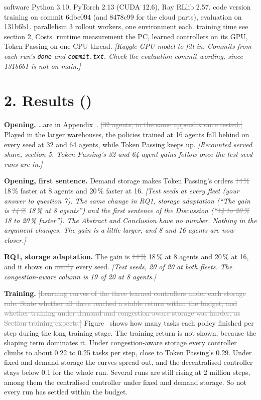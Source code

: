\documentclass[11pt,a4paper]{article}
\newcommand{\new}[1]{\textcolor{newc}{#1}}
\newcommand{\old}[1]{\textcolor{gray}{\sout{#1}}}
\newcommand{\note}[1]{{\small\itshape [#1]}}
\newcommand{\lab}[1]{\textsf{\footnotesize\detokenize{#1}}}
\renewcommand{\ref}[1]{\lab{#1}}
\begin{document}
\new{software} Python 3.10, PyTorch 2.13 (CUDA 12.6), Ray RLlib 2.57.
\new{code version} training on commit 6dbe094 (and 8478c99 for the cloud
parts), evaluation on 131b6b1. \new{parallelism} 3 rollout workers, one
environment each. \new{training time} see section 2, Costs.
\new{runtime measurement} the PC, learned controllers on its GPU, Token
Passing on one CPU thread.
\note{Kaggle GPU model to fill in. Commits from each run's \texttt{done} and
\texttt{commit.txt}. Check the evaluation commit wording, since 131b6b1 is not
on main.}

\section*{2. Results (\lab{sec:exp:results})}

\textbf{Opening.} \ldots are in Appendix~\ref{app:results:tests}.
\old{[32 agents, in the same appendix once tested.]}
\new{Played in the larger warehouses, the policies trained at 16 agents fall
behind on every seed at 32 and 64 agents, while Token Passing keeps up.}
\note{Recounted served share, section 5. Token Passing's 32 and 64-agent gains
follow once the test-seed runs are in.}

\textbf{Opening, first sentence.} Demand storage makes Token Passing's orders
\old{14\,\%} \new{18\,\%} faster at 8 agents and 20\,\% faster at 16.
\note{Test seeds at every fleet (your answer to question 7). The same change in
RQ1, storage adaptation (``The gain is \old{14\,\%} \new{18\,\%} at 8 agents'')
and the first sentence of the Discussion (``\old{14 to 20\,\%}
\new{18 to 20\,\%} faster''). The Abstract and Conclusion have no number.
Nothing in the argument changes. The gain is a little larger, and 8 and 16
agents are now closer.}

\textbf{RQ1, storage adaptation.} The gain is \old{14\,\%} \new{18\,\%} at 8
agents and 20\,\% at 16, and it shows on \old{nearly} every seed.
\note{Test seeds, 20 of 20 at both fleets. The congestion-aware column is 19
of 20 at 8 agents.}

\textbf{Training.} \old{[Learning curves of the three learned controllers
under each storage rule. State whether all three reached a stable return
within the budget, and whether training under demand and congestion-aware
storage was harder, as Section training expects.]}
\new{Figure~\ref{fig:exp:learning} shows how many tasks each policy finished
per step during the long training stage. The training return is not shown,
because the shaping term dominates it. Under congestion-aware storage every
controller climbs to about 0.22 to 0.25 tasks per step, close to Token
Passing's 0.29. Under fixed and demand storage the curves spread out, and the
decentralised controller stays below 0.1 for the whole run. Several runs are
still rising at 2 million steps, among them the centralised controller under
fixed and demand storage. So not every run has settled within the budget.}
\end{document}
